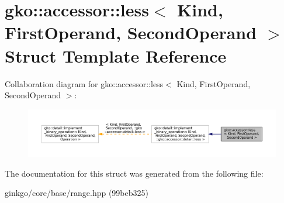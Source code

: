 \hypertarget{structgko_1_1accessor_1_1less}{}\section{gko\+:\+:accessor\+:\+:less$<$ Kind, First\+Operand, Second\+Operand $>$ Struct Template Reference}
\label{structgko_1_1accessor_1_1less}


Collaboration diagram for gko\+:\+:accessor\+:\+:less$<$ Kind, First\+Operand, Second\+Operand $>$\+:
\nopagebreak
\begin{figure}[H]
\begin{center}
\leavevmode
\includegraphics[width=350pt]{structgko_1_1accessor_1_1less__coll__graph}
\end{center}
\end{figure}


The documentation for this struct was generated from the following file\+:\begin{DoxyCompactItemize}
\item 
ginkgo/core/base/range.\+hpp (99beb325)\end{DoxyCompactItemize}
